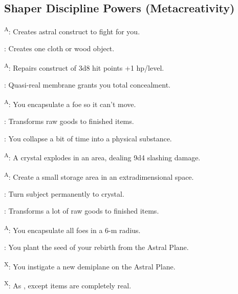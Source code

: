 \subsection{Shaper Discipline Powers {\normalsize(Metacreativity)}}
\begin{enumerate*}
\item {}\textsuperscript{A}: Creates astral construct to fight for you.

: Creates one cloth or wood object.

\item {}\textsuperscript{A}: Repairs construct of 3d8 hit points +1 hp/level.
\item {}: Quasi-real membrane grants you total concealment.

\textsuperscript{A}: You encapsulate a foe so it can't move.

\item {}: Transforms raw goods to finished items.

: You collapse a bit of time into a physical substance.

\item {}\textsuperscript{A}: A crystal explodes in an area, dealing 9d4 slashing damage.

\textsuperscript{A}: Create a small storage area in an extradimensional space. %

\item {}: Turn subject permanently to crystal.

: Transforms a lot of raw goods to finished items.

\item {}\textsuperscript{A}: You encapsulate all foes in a 6-m radius.
\item {}: You plant the seed of your rebirth from the Astral Plane.
\item {}\textsuperscript{X}: You instigate a new demiplane on the Astral Plane.

\textsuperscript{X}: As , except items are completely real.
\end{enumerate*}



